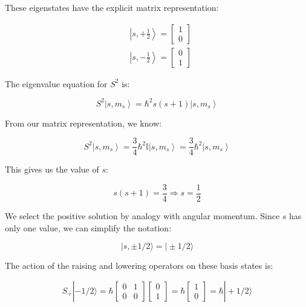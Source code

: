 These eigenstates have the explicit matrix representation:

\begin{align}
& \left|s,+\frac{1}{2}\right\rangle=\left[\begin{array}{l}
1 \\
0
\end{array}\right]  \\
& \left|s,-\frac{1}{2}\right\rangle=\left[\begin{array}{l}
0 \\
1
\end{array}\right]
\end{align}

The eigenvalue equation for $S^2$ is:

\begin{equation}
S^{2}\left|s, m_{s}\right\rangle=\hbar^{2} s(s+1)\left|s, m_{s}\right\rangle
\end{equation}

From our matrix representation, we know:

\begin{equation}
S^{2}\left|s, m_{s}\right\rangle=\frac{3}{4} \hbar^{2} \mathbb{I}\left|s, m_{s}\right\rangle=\frac{3}{4} \hbar^{2}\left|s, m_{s}\right\rangle
\end{equation}

This gives us the value of $s$:

\begin{equation}
s(s+1)=\frac{3}{4} \Longrightarrow s=\frac{1}{2}
\end{equation}

We select the positive solution by analogy with angular momentum. Since $s$ has only one value, we can simplify the notation:

\begin{equation}
|s, \pm 1/2\rangle=|\pm 1/2\rangle
\end{equation}

The action of the raising and lowering operators on these basis states is:

\[
S_{+}|-1/2\rangle=\hbar\left[\begin{array}{ll}
0 & 1  \\
0 & 0
\end{array}\right]\left[\begin{array}{l}
0 \\
1
\end{array}\right]=\hbar\left[\begin{array}{l}
1 \\
0
\end{array}\right]=\hbar|+1/2\rangle
\]

